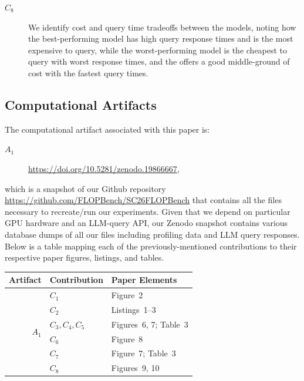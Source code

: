 \begin{description}
\item[$C_8$] We identify cost and query time tradeoffs between the models, noting how the best-performing \opus model has high query response times and is the most expensive to query, while the worst-performing \gptoss model is the cheapest to query with worst response times, and the \gptfivefour offers a good middle-ground of cost with the fastest query times.
\end{description}


\subsection{Computational Artifacts}


The computational artifact associated with this paper is:

\begin{description}
\item[$A_1$] \url{https://doi.org/10.5281/zenodo.19866667}, 
\end{description}

which is a snapshot of our Github repository \url{https://github.com/FLOPBench/SC26FLOPBench} that contains all the files necessary to recreate/run our experiments.
Given that we depend on particular GPU hardware and an LLM-query API, our Zenodo snapshot contains various database dumps of all our files including profiling data and LLM query responses.
Below is a table mapping each of the previously-mentioned contributions to their respective paper figures, listings, and tables.


\begin{center}
\begin{tabular}{rll}
\toprule
Artifact  &  Contribution  &  Paper Elements \\
\midrule
\multirow{8}{*}{$A_1$} & $C_1$ & Figure~2 \\
                       & $C_2$ & Listings~1--3 \\
                       & $C_3,C_4,C_5$ & Figures~6, 7; Table~3 \\
                       & $C_6$ & Figure~8 \\
                       & $C_7$ & Figure~7; Table~3 \\
                       & $C_8$ & Figures~9, 10 \\
\bottomrule
\end{tabular}
\end{center}

